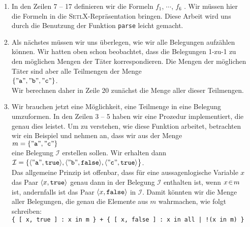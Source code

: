 \begin{enumerate}
\item In den Zeilen 7 -- 17 definieren wir die Formeln $f_1$, $\cdots$, $f_6$      .
      Wir m\"{u}ssen hier die Formeln in die \textsc{SetlX}-Repr\"{a}sentation bringen.
      Diese Arbeit wird uns durch die Benutzung der Funktion \texttt{parse} leicht gemacht.
\item Als n\"{a}chstes m\"{u}ssen wir uns \"{u}berlegen, wie wir alle Belegungen aufz\"{a}hlen k\"{o}nnen. 
      Wir hatten oben schon beobachtet, dass die Belegungen 1-zu-1 zu den m\"{o}glichen Mengen der T\"{a}ter
      korrespondieren.  Die Mengen der m\"{o}glichen T\"{a}ter sind aber alle Teilmengen der Menge
      \\[0.2cm]
      \hspace*{1.3cm}
      $\{ \squote{a}, \squote{b}, \squote{c} \}$. 
      \\[0.2cm]
      Wir berechnen daher in Zeile 20 zun\"{a}chst die Menge aller dieser Teilmengen.
\item Wir brauchen jetzt eine M\"{o}glichkeit, eine Teilmenge in eine Belegung umzuformen.
      In den Zeilen 3 -- 5 haben wir eine Prozedur implementiert, die genau dies
      leistet.  Um zu verstehen, wie diese Funktion arbeitet, betrachten wir ein Beispiel
      und nehmen an, dass wir aus der Menge \\[0.2cm]
      \hspace*{1.3cm} $m = \{\squote{a}, \squote{c} \}$ \\[0.2cm]
      eine Belegung $\mathcal{I}$ erstellen sollen.  Wir erhalten dann \\[0.2cm]
      \hspace*{1.3cm} 
      $\mathcal{I} = \{ \pair(\squote{a},\mathtt{true}), 
                        \pair(\squote{b},\mathtt{false}),
                        \pair(\squote{c},\mathtt{true}) 
       \bigr\}
      $. 
      \\[0.2cm]
      Das allgemeine Prinzip ist offenbar, dass f\"{u}r eine aussagenlogische Variable
      $x$ das Paar $\pair(x,\mathtt{true})$ genau dann in der Belegung $\mathcal{I}$
      enthalten ist, wenn $x \!\in\! m$ ist, andernfalls ist das Paar $\pair(x,\mathtt{false})$
      in $\mathcal{I}$.  Damit k\"{o}nnten wir die Menge aller Belegungen, die genau die
      Elemente aus $m$ wahrmachen, wie folgt schreiben:
      \\[0.2cm]
      \hspace*{1.3cm}      
      \texttt{\{ [ x, true ] : x in m \} + \{ [ x, false ] : x in all | !(x in m) \}}

\end{enumerate}
